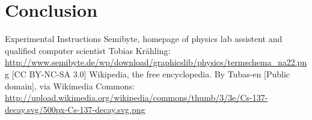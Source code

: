 \documentclass[bigchapter,colorback,accentcolor=tud4b,linedtoc,11pt]{tudreport}
\begin{document}
\begin{center}
\begin{figure}[H]
\end{figure}
\end{center}

\chapter{Conclusion}

\cleardoublepage{}
\newpage
\begin{thebibliography}{100}
   {Experimental Instructions}  {Semibyte, homepage of physics lab assistent and qualified
      computer scientist Tobias Krähling:
      \url{http://www.semibyte.de/wp/download/graphicslib/physics/termschema_na22.png}
    [CC BY-NC-SA 3.0]}
   {Wikipedia, the free encyclopedia. By Tubas-en [Public
      domain], via Wikimedia Commons: \url{http://upload.wikimedia.org/wikipedia/commons/thumb/3/3e/Cs-137-decay.svg/500px-Cs-137-decay.svg.png}}
\end{thebibliography}
\end{document}
